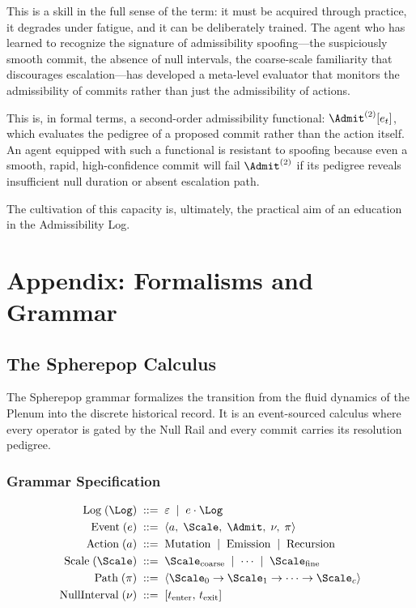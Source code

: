 \documentclass[11pt,oneside]{book}
\begin{document}
This is a skill in the full sense of the term: it must be acquired through practice, it degrades under fatigue, and it can be deliberately trained. The agent who has learned to recognize the signature of admissibility spoofing---the suspiciously smooth commit, the absence of null intervals, the coarse-scale familiarity that discourages escalation---has developed a meta-level evaluator that monitors the admissibility of commits rather than just the admissibility of actions.

This is, in formal terms, a second-order admissibility functional: $\Admit^{(2)}[e_t]$, which evaluates the pedigree of a proposed commit rather than the action itself. An agent equipped with such a functional is resistant to spoofing because even a smooth, rapid, high-confidence commit will fail $\Admit^{(2)}$ if its pedigree reveals insufficient null duration or absent escalation path.

The cultivation of this capacity is, ultimately, the practical aim of an education in the Admissibility Log.

\chapter{Appendix: Formalisms and Grammar}

\section{The Spherepop Calculus}

The Spherepop grammar formalizes the transition from the fluid dynamics of the Plenum into the discrete historical record. It is an event-sourced calculus where every operator is gated by the Null Rail and every commit carries its resolution pedigree.

\subsection{Grammar Specification}

\begin{align*}
    \text{Log}\;(\Log) &\;::=\; \varepsilon \;\mid\; e \cdot \Log \\
    \text{Event}\;(e) &\;::=\; \langle a,\; \Scale,\; \Admit,\; \nu,\; \pi \rangle \\
    \text{Action}\;(a) &\;::=\; \text{Mutation} \;\mid\; \text{Emission} \;\mid\; \text{Recursion} \\
    \text{Scale}\;(\Scale) &\;::=\; \Scale_{\mathrm{coarse}} \;\mid\; \cdots \;\mid\; \Scale_{\mathrm{fine}} \\
    \text{Path}\;(\pi) &\;::=\; \langle \Scale_0 \to \Scale_1 \to \cdots \to \Scale_c \rangle \\
    \text{NullInterval}\;(\nu) &\;::=\; [t_{\mathrm{enter}},\, t_{\mathrm{exit}}]
\end{align*}
\end{document}
